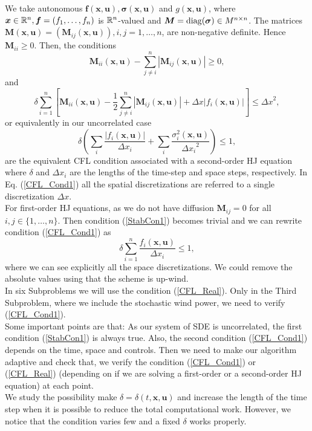 We take autonomous $\bm{f}(\bm{x},\bm{u}),\bm{\sigma}(\bm{x},\bm{u})$ and $g(\bm{x},\bm{u})$, 
where $\bm{x}\in\mathbb{R}^n,\bm{f}=(f_1,\dots,f_n)$ is $\mathbb{R}^n$-valued and 
$\bm{M}=\operatorname{diag}(\bm{\sigma})\in M^{n\times n}$. The matrices $\bm{M}(\bm{x},\bm{u})=(\bm{M}_{ij}(\bm{x},\bm{u})),i,j=1,\dots,n$, are non-negative 
definite. Hence $\bm{M}_{ii}\geq0$. Then, the conditions
\begin{equation}
\bm{M}_{ii}(\bm{x},\bm{u})-\sum^n_{j\neq i}|\bm{M}_{ij}(\bm{x},\bm{u})|\geq0,
\label{StabCon1}
\end{equation}
and
\begin{equation}
\delta\sum_{i=1}^n\left[\bm{M}_{ii}(\bm{x},\bm{u})-\frac{1}{2}\sum^n_{j\neq i}\left|\bm{M}_{ij}(\bm{x},\bm{u})\right|+\Delta x\left|f_i(\bm{x},\bm{u})\right|\right]\leq{\Delta x}^2,
\label{CFL_Cond1}
\end{equation}
or equivalently in our uncorrelated case
\begin{equation}
\delta\left( \sum_i{\frac{|f_i(\bm{x},\bm{u})|}{\Delta x_i} }+ \sum_i{\frac{\sigma_{i}^2(\bm{x},\bm{u})}{{\Delta x_i}^2}}\right) \leq 1,
\label{CFL_Cond2}
\end{equation}
are the equivalent CFL condition associated with a second-order HJ equation where 
$\delta$ and $\Delta x_i$ are the lengths of the time-step and space steps, respectively. 
In Eq. (\ref{CFL_Cond1}) all the spatial discretizations are referred to a single discretization $\Delta x$.\\
For first-order HJ equations, as we do not have diffusion $\bm{M}_{ij}=0$ for all $i,j\in\{1,\dots,n\}$. Then condition (\ref{StabCon1}) becomes trivial and we can rewrite condition (\ref{CFL_Cond1}) as
\begin{equation}
\delta\sum_{i=1}^n\frac{f_i(\bm{x},\bm{u})}{\Delta x_i}\leq1,
\label{CFL_Real}
\end{equation}
where we can see explicitly all the space discretizations. We could remove the absolute values using that the scheme is up-wind.\\
In six Subproblems we will use the condition (\ref{CFL_Real}). Only in the Third Subproblem, where we include the stochastic wind power, we need to verify (\ref{CFL_Cond1}).\\
Some important points are that: As our system of SDE is uncorrelated, the first condition (\ref{StabCon1}) is always true. Also, the second condition (\ref{CFL_Cond1}) depends on the time, space and controls. Then we need to make our algorithm adaptive and check that, we verify the condition (\ref{CFL_Cond1}) or (\ref{CFL_Real}) (depending on if we are solving a first-order or a second-order HJ equation) at each point.\\
We study the possibility make $\delta=\delta(t,\bm{x},\bm{u})$ and increase the length of the time step when it is possible to reduce the total computational work. However, we notice that the condition varies few and a fixed $\delta$ works properly.

